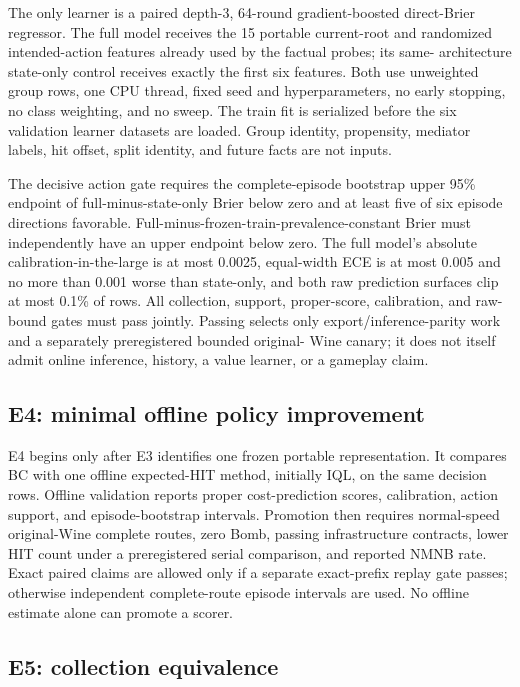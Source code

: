 \documentclass[11pt]{article}
\begin{document}
The only learner is a paired depth-3, 64-round gradient-boosted direct-Brier
regressor.  The full model receives the 15 portable current-root and randomized
intended-action features already used by the factual probes; its same-
architecture state-only control receives exactly the first six features.  Both
use unweighted group rows, one CPU thread, fixed seed and hyperparameters, no
early stopping, no class weighting, and no sweep.  The train fit is serialized
before the six validation learner datasets are loaded.  Group identity,
propensity, mediator labels, hit offset, split identity, and future facts are
not inputs.

The decisive action gate requires the complete-episode bootstrap upper 95\%
endpoint of full-minus-state-only Brier below zero and at least five of six
episode directions favorable.  Full-minus-frozen-train-prevalence-constant
Brier must independently have an upper endpoint below zero.  The full model's
absolute calibration-in-the-large is at most 0.0025, equal-width ECE is at most
0.005 and no more than 0.001 worse than state-only, and both raw prediction
surfaces clip at most 0.1\% of rows.  All collection, support, proper-score,
calibration, and raw-bound gates must pass jointly.  Passing selects only
export/inference-parity work and a separately preregistered bounded original-
Wine canary; it does not itself admit online inference, history, a value
learner, or a gameplay claim.

\subsection{E4: minimal offline policy improvement}

E4 begins only after E3 identifies one frozen portable representation.  It
compares BC with one offline expected-HIT method, initially IQL, on the same
decision rows.  Offline validation reports proper cost-prediction scores,
calibration, action support, and episode-bootstrap intervals.  Promotion then
requires normal-speed original-Wine complete routes, zero Bomb, passing
infrastructure contracts, lower HIT count under a preregistered serial
comparison, and reported NMNB rate.  Exact paired claims are allowed only if a
separate exact-prefix replay gate passes; otherwise independent complete-route
episode intervals are used.  No offline estimate alone can promote a scorer.

\subsection{E5: collection equivalence}
\end{document}
